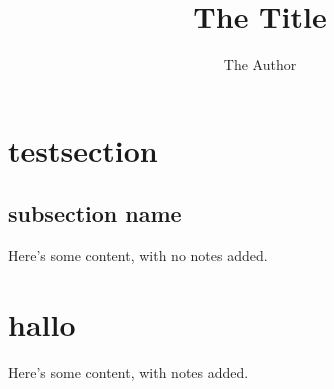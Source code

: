 \documentclass{beamer}
\title{The Title}
\author{The Author}
\begin{document}
\section{testsection}
\subsection{subsection name}
\begin{frame}
Here's some content, with no notes added.
\end{frame}

\section{hallo}
\begin{frame}
Here's some content, with notes added.
\end{frame}
\end{document}
